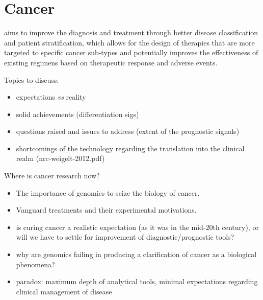 \section{Cancer}
\label{cancer-discussion}


 aims to improve the diagnosis and treatment through
better disease classification and patient stratification, which allows for the
design of therapies that are more targeted to specific cancer sub-types and
potentially improves the effectiveness of existing regimens based on therapeutic
response and adverse events.

Topics to discuss:
\begin{itemize}
\item expectations \emph{vs} reality
\item solid achievements (differentiation sigs)
\item questions raised and issues to address (extent of the prognostic signals)
\item shortcomings of the technology regarding the translation into the clinical realm (nrc-weigelt-2012.pdf)
\end{itemize}

\bigskip

Where is cancer research now?
\begin{itemize}
\item The importance of genomics to seize the biology of cancer.
\item Vanguard treatments and their experimental motivations.
\item is curing cancer a realistic expectation (as it was in the mid-20th
  century), or will we have to settle for improvement of diagnostic/prognostic
  tools?
\item why are genomics failing in producing a clarification of cancer as
  a biological phenomena?
\item paradox: maximum depth of analytical tools, minimal expectations regarding
  clinical management of disease
\end{itemize}

\clearpage

